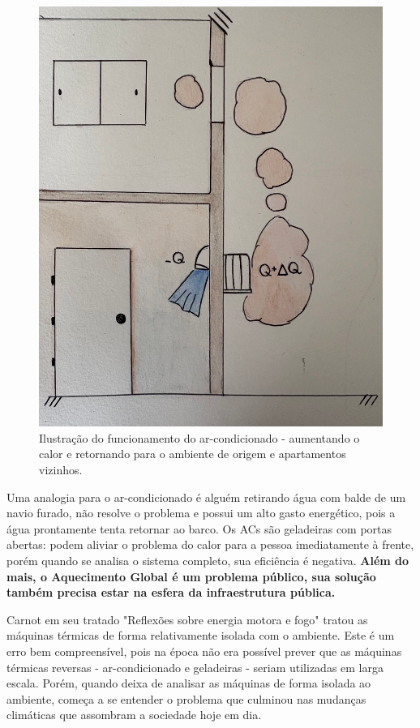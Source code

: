 \begin{figure}[ht]
    \centering
    \includegraphics[scale=0.35]{pictures/predio.png}
    \caption{Ilustração do funcionamento do ar-condicionado - aumentando o calor e retornando para o ambiente de origem e apartamentos vizinhos.}
    \label{predios}
\end{figure}

Uma analogia para o ar-condicionado é alguém retirando água com balde de um navio furado, não resolve o problema e possui um alto gasto energético, pois a água prontamente tenta retornar ao barco. Os ACs são geladeiras com portas abertas: podem aliviar o problema do calor para a pessoa imediatamente à frente, porém quando se analisa o sistema completo, sua eficiência é negativa.\textbf{ Além do mais, o Aquecimento Global é um problema público, sua solução também precisa estar na esfera da infraestrutura pública.}
                                  
Carnot em seu tratado "Reflexões sobre energia motora e fogo" tratou as máquinas térmicas de forma relativamente isolada com o ambiente. Este é um erro bem compreensível, pois na época não era possível prever que as máquinas térmicas reversas - ar-condicionado e geladeiras - seriam utilizadas em larga escala. Porém, quando deixa de analisar as máquinas de forma isolada ao ambiente, começa a se entender o problema que culminou nas mudanças climáticas que assombram a sociedade hoje em dia.                                                         


